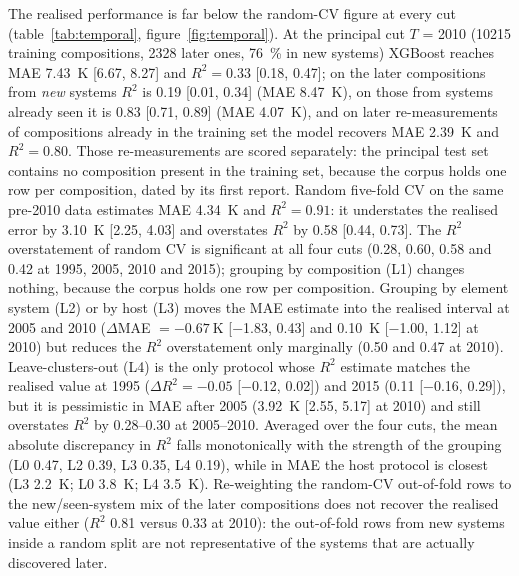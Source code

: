 \documentclass{iopjournal}
\newcommand{\Rsq}{R^{2}}
\newcommand{\ci}[2]{[\num{#1}, \num{#2}]}
\begin{document}
The realised performance is far below the random-CV figure at every cut (table~\ref{tab:temporal},
figure~\ref{fig:temporal}). At the principal cut $T$ = 2010 (\num{10215} training compositions,
\num{2328} later ones, \SI{76}{\percent} in new systems) XGBoost reaches MAE \SI{7.43}{\kelvin}
\ci{6.67}{8.27} and $\Rsq = \num{0.33}$ \ci{0.18}{0.47}; on the later compositions from \emph{new}
systems $\Rsq$ is \num{0.19} \ci{0.01}{0.34} (MAE \SI{8.47}{\kelvin}), on those from systems already
seen it is \num{0.83} \ci{0.71}{0.89} (MAE \SI{4.07}{\kelvin}), and on later re-measurements of
compositions already in the training set the model recovers MAE \SI{2.39}{\kelvin} and $\Rsq = \num{0.80}$. Those re-measurements are scored separately: the principal test set contains no composition present in the training set, because the corpus holds one row per composition, dated by its first report. Random five-fold CV on the same pre-2010 data estimates MAE \SI{4.34}{\kelvin}
and $\Rsq = \num{0.91}$: it understates the realised error by \SI{3.10}{\kelvin} \ci{2.25}{4.03}
and overstates $\Rsq$ by \num{0.58} \ci{0.44}{0.73}. The $\Rsq$ overstatement of random CV is
significant at all four cuts (\num{+0.28}, \num{+0.60}, \num{+0.58} and \num{+0.42} at 1995,
2005, 2010 and 2015); grouping by composition (L1) changes nothing, because the corpus holds one row
per composition. Grouping by element system (L2) or by host (L3) moves the MAE estimate into the
realised interval at 2005 and 2010 ($\Delta$MAE $=\SI{-0.67}{\kelvin}$ \ci{-1.83}{+0.43} and
\SI{+0.10}{\kelvin} \ci{-1.00}{+1.12} at 2010) but reduces the $\Rsq$ overstatement only
marginally (\num{+0.50} and \num{+0.47} at 2010). Leave-clusters-out (L4) is the only protocol
whose $\Rsq$ estimate matches the realised value at 1995 ($\Delta\Rsq = \num{-0.05}$
\ci{-0.12}{+0.02}) and 2015 (\num{+0.11} \ci{-0.16}{+0.29}), but it is pessimistic in MAE after
2005 (\SI{+3.92}{\kelvin} \ci{2.55}{5.17} at 2010) and still overstates $\Rsq$ by
\numrange{0.28}{0.30} at 2005--2010. Averaged over the four cuts, the mean absolute discrepancy
in $\Rsq$ falls monotonically with the strength of the grouping (L0 \num{0.47}, L2 \num{0.39}, L3
\num{0.35}, L4 \num{0.19}), while in MAE the host protocol is closest (L3 \SI{2.2}{\kelvin}; L0
\SI{3.8}{\kelvin}; L4 \SI{3.5}{\kelvin}). Re-weighting the random-CV out-of-fold rows to the
new/seen-system mix of the later compositions does not recover the realised value either ($\Rsq$
\num{0.81} versus \num{0.33} at 2010): the out-of-fold rows from new systems inside a random split
are not representative of the systems that are actually discovered later.
\end{document}
